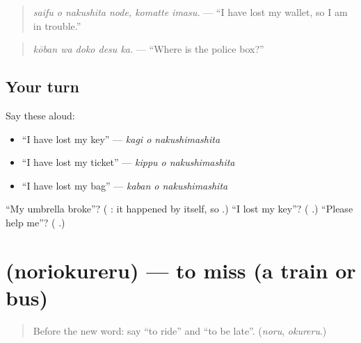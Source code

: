 \begin{quote}
\emph{saifu o nakushita node, komatte imasu.} — \textquotedblleft{}I have lost my wallet, so I am in trouble.\textquotedblright{}
\end{quote}

\begin{quote}
\textbf{ }
\end{quote}

\begin{quote}
\emph{kōban wa doko desu ka.} — \textquotedblleft{}Where is the police box?\textquotedblright{}
\end{quote}

\subsection*{Your turn}
Say these aloud:

\begin{itemize}
\raggedright
  \item \textquotedblleft{}I have lost my key\textquotedblright{} — \emph{kagi o nakushimashita}
  \item \textquotedblleft{}I have lost my ticket\textquotedblright{} — \emph{kippu o nakushimashita}
  \item \textquotedblleft{}I have lost my bag\textquotedblright{} — \emph{kaban o nakushimashita}
\end{itemize}

\begin{tcolorbox}[breakable,colback=teal!4,colframe=teal!35!black,title={Before you move on}]
\textquotedblleft{}My umbrella broke\textquotedblright{}? (\textbf{ }: it happened by itself, so \textbf{}.) \textquotedblleft{}I lost my key\textquotedblright{}? (\textbf{ }.) \textquotedblleft{}Please help me\textquotedblright{}? (\textbf{ }.)
\end{tcolorbox}
\section[\texorpdfstring{\ja{のりおくれる} (noriokureru)}{のりおくれる (noriokureru)}]{ (noriokureru) — to miss (a train or bus)}

\label{lesson:JA-C257-noriokureru}



\begin{quote}
Before the new word: say \textquotedblleft{}to ride\textquotedblright{} and \textquotedblleft{}to be late\textquotedblright{}. (\emph{noru}, \emph{okureru}.)
\end{quote}


